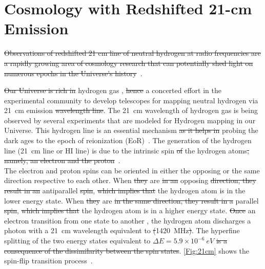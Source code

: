 	\section{Cosmology with Redshifted 21-cm Emission}
	
		
	\st{Observations of redshifted 21 cm line of neutral hydrogen at radio frequencies are a rapidly growing area of cosmology research that can potentially shed light on numerous epochs in the Universe's history}~\citep{2012RPPh...75h6901P}. 
	
	 \st{Our Universe is rich in} hydrogen gas , \st{hence}  a concerted effort in the experimental community to develop telescopes for mapping neutral hydrogen via \SI{21}{cm} emission \st{wavelength line}. The \SI{21}{cm} wavelength of hydrogen gas is being observed by several experiments that are modeled for Hydrogen mapping in our Universe.  This hydrogen line is an essential mechanism \st{as it helps in}  probing the dark ages to the epoch of reionization (EoR)~\citep{2013PhRvD..87d3002L,2014ApJ...782...66P}. The generation of the hydrogen line (\SI{21}{cm} line or HI line) is due to the intrinsic spin \st{of} the hydrogen atoms\st{, namely, an electron and the proton}~\citep{book:832129}.   \\
	
	The electron and proton spins can be oriented in either the opposing or the same direction respective to each other. When \st{they}  are \st{in an} opposing \st{direction, they result in an}  antiparallel \st{spin}, \st{which implies that} the hydrogen atom is in the lower energy state. When \st{they}  are \st{in the same direction, they result in a} parallel \st{spin}, \st{which implies that} the hydrogen atom is in a higher energy state. \st{Once}  an electron transition from one state to another , the hydrogen atom discharges a photon with a \SI{21}{cm} wavelength\attention{,} equivalent to \st{(}\SI{1420}{MHz}\st{)}. The hyperfine splitting of the two energy states  equivalent to \(\Delta E =  5.9 \times 10^{-6} \ eV\) \st{is a consequence of the dissimilarity between the spin states}. \autoref{Fig:21cm} shows the spin-flip transition process~\citep{16, book:832129}.
	
